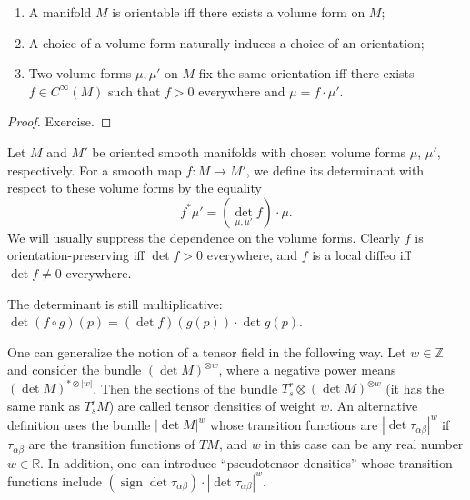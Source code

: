 \documentclass[english,letterpaper]{article}%
\numberwithin{equation}{section}
\numberwithin{figure}{section}
\numberwithin{table}{section}
\theoremstyle{definition}
\theoremstyle{definition}
\theoremstyle{definition}
\theoremstyle{plain}
\theoremstyle{plain}
\theoremstyle{plain}
\theoremstyle{plain}
\theoremstyle{remark}
\theoremstyle{remark}
\DeclareMathOperator{\sign}{sign}
\begin{document}
\begin{prop}
\begin{enumerate}
    \item A manifold $M$ is orientable iff there exists a volume form on $M$;
    \item A choice of a volume form naturally induces a choice of an orientation;
    \item Two volume forms $\mu,\mu'$ on $M$ fix the same orientation iff there exists $f\in C^\infty(M)$ such that $f>0$ everywhere and $\mu=f\cdot \mu'$. 
\end{enumerate}
\end{prop}
\begin{proof}
Exercise.
\end{proof}


\begin{defn}
Let $M$ and $M'$ be oriented smooth manifolds with chosen volume forms $\mu$, $\mu'$, respectively. For a smooth map $f:M\to M'$, we define its determinant with respect to these volume forms by the equality
\[f^\ast \mu'=\left(\det_{\mu,\mu'}f\right)\cdot \mu.\]
We will usually suppress the dependence on the volume forms. Clearly $f$ is orientation-preserving iff $\det f>0$ everywhere, and $f$ is a local diffeo iff $\det f\neq 0$ everywhere.

The determinant is still multiplicative: $\det(f\circ g)(p)=(\det f)(g(p))\cdot \det g(p)$.
\end{defn}

\begin{defn}
One can generalize the notion of a tensor field in the following way. Let $w\in\mathbb{Z}$ and consider the bundle $(\det M)^{\otimes w}$, where a negative power means $(\det M)^{\ast\otimes |w|}$. Then the sections of the bundle $T^r_s\otimes (\det M)^{\otimes w}$ (it has the same rank as $T^r_s M$) are called tensor densities of weight $w$. An alternative definition uses the bundle $\left|\det M\right|^{w}$ whose transition functions are $|\det\tau_{\alpha\beta}|^w$ if $\tau_{\alpha\beta}$ are the transition functions of $TM$, and $w$ in this case can be any real number $w\in\mathbb{R}$. In addition, one can introduce ``pseudotensor densities'' whose transition functions include $(\sign\det\tau_{\alpha\beta})\cdot |\det\tau_{\alpha\beta}|^w$.
\end{defn}
\end{document}
